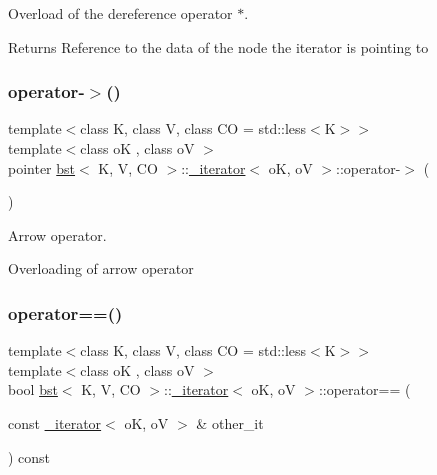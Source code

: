 Overload of the dereference operator $\ast$. 

\begin{DoxyReturn}{Returns}
Reference to the data of the node the iterator is pointing to 
\end{DoxyReturn}
\mbox{\label{classbst_1_1__iterator_ab0600ef918d7840c080a7dab0e43d8cd}} 
\subsubsection{\texorpdfstring{operator-\/$>$()}{operator->()}\hspace{0.1cm}{\footnotesize\ttfamily [2/2]}}
{\footnotesize\ttfamily template$<$class K, class V, class CO = std\+::less$<$\+K$>$$>$ \\
template$<$class oK , class oV $>$ \\
pointer \hyperlink{classbst}{bst}$<$ K, V, CO $>$\+::\hyperlink{classbst_1_1__iterator}{\+\_\+iterator}$<$ oK, oV $>$\+::operator-\/$>$ (\begin{DoxyParamCaption}{ }\end{DoxyParamCaption})\hspace{0.3cm}{\ttfamily [inline]}}



Arrow operator. 

Overloading of arrow operator \mbox{\label{classbst_1_1__iterator_a2faf29cee0b7d5e2ce002b5c9ae4070b}} 
\subsubsection{\texorpdfstring{operator==()}{operator==()}\hspace{0.1cm}{\footnotesize\ttfamily [1/2]}}
{\footnotesize\ttfamily template$<$class K, class V, class CO = std\+::less$<$\+K$>$$>$ \\
template$<$class oK , class oV $>$ \\
bool \hyperlink{classbst}{bst}$<$ K, V, CO $>$\+::\hyperlink{classbst_1_1__iterator}{\+\_\+iterator}$<$ oK, oV $>$\+::operator== (\begin{DoxyParamCaption}\item[{const \hyperlink{classbst_1_1__iterator}{\+\_\+iterator}$<$ oK, oV $>$ \&}]{other\+\_\+it }\end{DoxyParamCaption}) const\hspace{0.3cm}{\ttfamily [inline]}}



